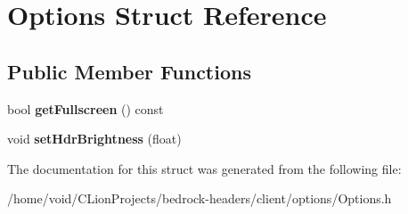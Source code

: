 \hypertarget{struct_options}{}\section{Options Struct Reference}
\label{struct_options}
\subsection*{Public Member Functions}
\begin{DoxyCompactItemize}
\item 
\mbox{\label{struct_options_aa7e56ca39ce7bcb3fb53d77eab77ac52}} 
bool {\bfseries get\+Fullscreen} () const
\item 
\mbox{\label{struct_options_a981aae0bebc0516008ba43ae631d08e9}} 
void {\bfseries set\+Hdr\+Brightness} (float)
\end{DoxyCompactItemize}


The documentation for this struct was generated from the following file\+:\begin{DoxyCompactItemize}
\item 
/home/void/\+C\+Lion\+Projects/bedrock-\/headers/client/options/Options.\+h\end{DoxyCompactItemize}
